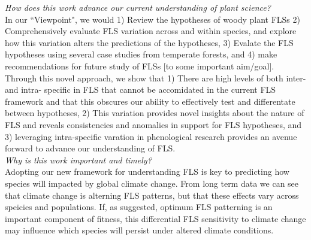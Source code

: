\documentclass[10.5pt,a4paper]{article}
\begin{document}
\noindent \emph{How does this work advance our current understanding of plant science?}\\
In our ``Viewpoint", we would 1) Review the hypotheses of woody plant FLSs 2) Comprehensively evaluate FLS variation across and within species, and explore how this variation alters the predictions of the hypotheses, 3) Evalate the FLS hypotheses using several case studies from temperate forests, and 4)
make recommendations for future study of FLSs [to some important aim/goal]. \\
Through this novel approach, we show that 1) There are high levels of both inter- and intra- specific in FLS that cannot be accomidated in the current FLS framework and that this obscures our ability to effectively test and differentate between hypotheses, 2) This variation provides novel insights about the nature of FLS and reveals consistencies and anomalies in support for FLS hypotheses, and 3) leveraging intra-specific varation in phenological research provides an avenue forward to advance our understanding of FLS.\\

\noindent \emph{Why is this work important and timely?}\\
Adopting our new framework for understanding FLS is key to predicting how species will impacted by global climate change. From long term data we can see that climate change is alterning FLS patterns, but that these effects vary across speicies and populations. If, as suggested, optimum FLS patterning is an important component of fitness, this differential FLS sensitivity to climate change may influence which species will persist under altered climate conditions.
\end{document}
